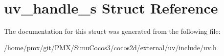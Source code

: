 \hypertarget{structuv__handle__s}{}\section{uv\+\_\+handle\+\_\+s Struct Reference}
\label{structuv__handle__s}


The documentation for this struct was generated from the following file\+:\begin{DoxyCompactItemize}
\item 
/home/pmx/git/\+P\+M\+X/\+Simu\+Cocos3/cocos2d/external/uv/include/uv.\+h\end{DoxyCompactItemize}
